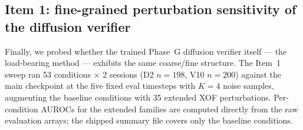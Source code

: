 \subsection{Item 1: fine-grained perturbation sensitivity of the diffusion verifier}
\label{sec:redteam_item1}

Finally, we probed whether the trained Phase~G diffusion verifier itself --- the load-bearing method --- exhibits the same coarse/fine structure. The Item~1 sweep ran 53 conditions $\times$ 2 sessions (D2 $n=198$, V10 $n=200$) against the main checkpoint at the five fixed eval timesteps with $K=4$ noise samples, augmenting the baseline conditions with 35 extended XOF perturbations. Per-condition AUROCs for the extended families are computed directly from the raw evaluation arrays; the shipped summary file covers only the baseline conditions.


